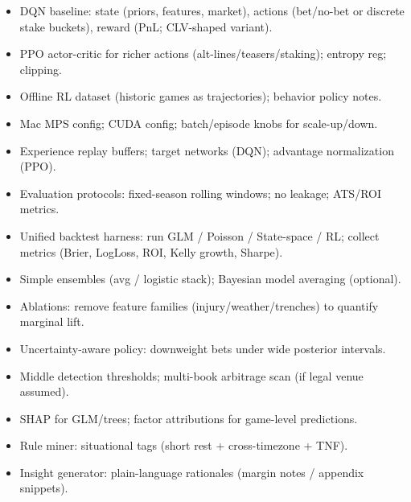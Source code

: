 \begin{itemize}
  \item {} DQN baseline: state (priors, features, market), actions (bet/no-bet or discrete stake buckets), reward (PnL; CLV-shaped variant).
  \item {} PPO actor-critic for richer actions (alt-lines/teasers/staking); entropy reg; clipping.
  \item {} Offline RL dataset (historic games as trajectories); behavior policy notes.
\end{itemize}

\begin{itemize}
  \item {} Mac MPS config; CUDA config; batch/episode knobs for scale-up/down.
  \item {} Experience replay buffers; target networks (DQN); advantage normalization (PPO).
  \item {} Evaluation protocols: fixed-season rolling windows; no leakage; ATS/ROI metrics.
\end{itemize}

\begin{itemize}
  \item {} Unified backtest harness: run GLM / Poisson / State-space / RL; collect metrics (Brier, LogLoss, ROI, Kelly growth, Sharpe).
  \item {} Simple ensembles (avg / logistic stack); Bayesian model averaging (optional).
  \item {} Ablations: remove feature families (injury/weather/trenches) to quantify marginal lift.
\end{itemize}

\begin{itemize}
  \item {} Uncertainty-aware policy: downweight bets under wide posterior intervals.
\end{itemize}

\begin{itemize}
  \item {} Middle detection thresholds; multi-book arbitrage scan (if legal venue assumed).
\end{itemize}

\begin{itemize}
  \item {} SHAP for GLM/trees; factor attributions for game-level predictions.
  \item {} Rule miner: situational tags (short rest + cross-timezone + TNF).
  \item {} Insight generator: plain-language rationales (margin notes / appendix snippets).
\end{itemize}

